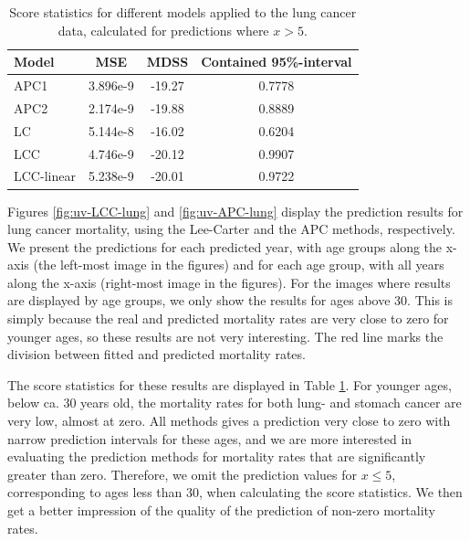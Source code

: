 \begin{table}[h!]
    \begin{center}
        \begin{tabular}{l |c c c }
            Model & MSE &   MDSS & Contained 95\%-interval\\
            \hline
            APC1    & 3.896e-9 & -19.27    & 0.7778 \\
            APC2    & 2.174e-9 & -19.88    & 0.8889 \\
            LC      & 5.144e-8 & -16.02    & 0.6204 \\
            LCC     & 4.746e-9 & -20.12    & 0.9907 \\
            LCC-linear      & 5.238e-9 & -20.01    & 0.9722 \\
        \end{tabular}
        \caption{Score statistics for different models applied to the lung cancer data, calculated for predictions where $x > 5$.}\label{tbl:uv-lung-5}
    \end{center}
\end{table}

\newpar Figures \ref{fig:uv-LCC-lung} and \ref{fig:uv-APC-lung} display the prediction results for lung cancer mortality, using the Lee-Carter and the APC methods, respectively. We present the predictions for each predicted year, with age groups along the x-axis (the left-most image in the figures) and for each age group, with all years along the x-axis (right-most image in the figures). For the images where results are displayed by age groups, we only show the results for ages above 30. This is simply because the real and predicted mortality rates are very close to zero for younger ages, so these results are not very interesting. The red line marks the division between fitted and predicted mortality rates. 

\newpar The score statistics for these results are displayed in Table \ref{tbl:uv-lung-5}. For younger ages, below ca. 30 years old, the mortality rates for both lung- and stomach cancer are very low, almost at zero. All methods gives a prediction very close to zero with narrow prediction intervals for these ages, and we are more interested in evaluating the prediction methods for mortality rates that are significantly greater than zero. Therefore, we omit the prediction values for $x \leq 5$, corresponding to ages less than 30, when calculating the score statistics. We then get a better impression of the quality of the prediction of non-zero mortality rates. 

